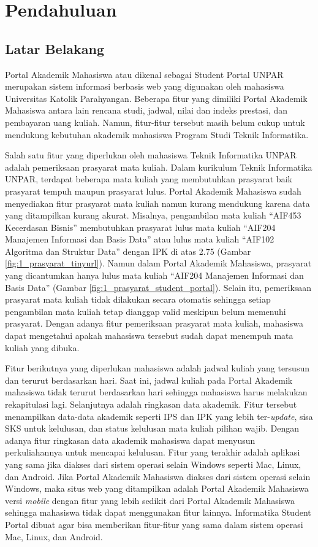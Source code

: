 \chapter{Pendahuluan}
\label{chap:pendahuluan}

\section{Latar Belakang}
\label{sec:latar_belakang}

Portal Akademik Mahasiswa atau dikenal sebagai Student Portal UNPAR\cite{studentportalunpar} merupakan sistem informasi berbasis web yang digunakan oleh mahasiswa Universitas Katolik Parahyangan. Beberapa fitur yang dimiliki Portal Akademik Mahasiswa antara lain rencana studi, jadwal, nilai dan indeks prestasi, dan pembayaran uang kuliah. Namun, fitur-fitur tersebut masih belum cukup untuk mendukung kebutuhan akademik mahasiswa Program Studi Teknik Informatika. 

Salah satu fitur yang diperlukan oleh mahasiswa Teknik Informatika UNPAR adalah pemeriksaan prasyarat mata kuliah. Dalam kurikulum Teknik Informatika UNPAR, terdapat beberapa mata kuliah yang membutuhkan prasyarat baik prasyarat tempuh maupun prasyarat lulus. Portal Akademik Mahasiswa sudah menyediakan fitur prasyarat mata kuliah namun kurang mendukung karena data yang ditampilkan kurang akurat. Misalnya, pengambilan mata kuliah ``AIF453 Kecerdasan Bisnis'' membutuhkan prasyarat lulus mata kuliah ``AIF204 Manajemen Informasi dan Basis Data'' atau lulus mata kuliah ``AIF102 Algoritma dan Struktur Data'' dengan IPK di atas 2.75 (Gambar \ref{fig:1_prasyarat_tinyurl}). Namun dalam Portal Akademik Mahasiswa, prasyarat yang dicantumkan hanya lulus mata kuliah ``AIF204 Manajemen Informasi dan Basis Data'' (Gambar \ref{fig:1_prasyarat_student_portal}). Selain itu, pemeriksaan prasyarat mata kuliah tidak dilakukan secara otomatis sehingga setiap pengambilan mata kuliah tetap dianggap valid meskipun belum memenuhi prasyarat. Dengan adanya fitur pemeriksaan prasyarat mata kuliah, mahasiswa dapat mengetahui apakah mahasiswa tersebut sudah dapat menempuh mata kuliah yang dibuka.

Fitur berikutnya yang diperlukan mahasiswa adalah jadwal kuliah yang tersusun dan terurut berdasarkan hari. Saat ini, jadwal kuliah pada Portal Akademik mahasiswa tidak terurut berdasarkan hari sehingga mahasiswa harus melakukan rekapitulasi lagi. Selanjutnya adalah ringkasan data akademik. Fitur tersebut menampilkan data-data akademik seperti IPS dan IPK yang lebih ter-\textit{update}, sisa SKS untuk kelulusan, dan status kelulusan mata kuliah pilihan wajib. Dengan adanya fitur ringkasan data akademik mahasiswa dapat menyusun perkuliahannya untuk mencapai kelulusan. Fitur yang terakhir adalah aplikasi yang sama jika diakses dari sistem operasi selain Windows seperti Mac, Linux, dan Android. Jika Portal Akademik Mahasiswa diakses dari sistem operasi selain Windows, maka situs web yang ditampilkan adalah Portal Akademik Mahasiswa versi \textit{mobile} dengan fitur yang lebih sedikit dari Portal Akademik Mahasiswa sehingga mahasiswa tidak dapat menggunakan fitur lainnya. Informatika Student Portal dibuat agar bisa memberikan fitur-fitur yang sama dalam sistem operasi Mac, Linux, dan Android.   

